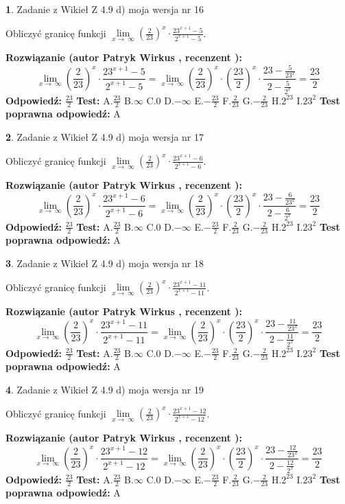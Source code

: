 \documentclass[12pt, a4paper]{article}
\theoremstyle{definition} %
\newtheorem{zad}{}
\newcommand{\zadStart}[1]{\begin{zad}#1\newline}
\newcommand{\zadStop}{\end{zad}}
\newcommand{\rozwStart}[2]{\noindent \textbf{Rozwiązanie (autor #1 , recenzent #2): }\newline}
\newcommand{\rozwStop}{\newline}
\newcommand{\odpStart}{\noindent \textbf{Odpowiedź:}\newline}
\newcommand{\odpStop}{\newline}
\newcommand{\testStart}{\noindent \textbf{Test:}\newline}
\newcommand{\testStop}{\newline}
\newcommand{\kluczStart}{\noindent \textbf{Test poprawna odpowiedź:}\newline}
\newcommand{\kluczStop}{\newline}
\begin{document}
\zadStart{Zadanie z Wikieł Z 4.9 d) moja wersja nr 16}


Obliczyć granicę funkcji  $\lim\limits_{x\to\ \infty}(\frac{2}{23})^{x}\cdot\frac{23^{x+1}-5}{2^{x+1}-5}$.
\zadStop
\rozwStart{Patryk Wirkus}{}
$$\lim\limits_{x\to\ \infty}(\frac{2}{23})^{x}\cdot\frac{23^{x+1}-5}{2^{x+1}-5}=\lim\limits_{x\to\ \infty}(\frac{2}{23})^{x}\cdot(\frac{23}{2})^{x} \cdot \frac{23-\frac{5}{23^{x}}}{2-\frac{5}{2^{x}}} = \frac{23}{2}$$
\rozwStop
\odpStart
$\frac{23}{2}$
\odpStop
\testStart
A.$\frac{23}{2}$ B.$\infty$ C.$0$ D.$-\infty$ E.$-\frac{23}{2}$
F.$\frac{2}{23}$ G.$-\frac{2}{23}$
H.$2^{23}$
I.$23^{2}$
\testStop
\kluczStart
A
\kluczStop



\zadStart{Zadanie z Wikieł Z 4.9 d) moja wersja nr 17}


Obliczyć granicę funkcji  $\lim\limits_{x\to\ \infty}(\frac{2}{23})^{x}\cdot\frac{23^{x+1}-6}{2^{x+1}-6}$.
\zadStop
\rozwStart{Patryk Wirkus}{}
$$\lim\limits_{x\to\ \infty}(\frac{2}{23})^{x}\cdot\frac{23^{x+1}-6}{2^{x+1}-6}=\lim\limits_{x\to\ \infty}(\frac{2}{23})^{x}\cdot(\frac{23}{2})^{x} \cdot \frac{23-\frac{6}{23^{x}}}{2-\frac{6}{2^{x}}} = \frac{23}{2}$$
\rozwStop
\odpStart
$\frac{23}{2}$
\odpStop
\testStart
A.$\frac{23}{2}$ B.$\infty$ C.$0$ D.$-\infty$ E.$-\frac{23}{2}$
F.$\frac{2}{23}$ G.$-\frac{2}{23}$
H.$2^{23}$
I.$23^{2}$
\testStop
\kluczStart
A
\kluczStop



\zadStart{Zadanie z Wikieł Z 4.9 d) moja wersja nr 18}


Obliczyć granicę funkcji  $\lim\limits_{x\to\ \infty}(\frac{2}{23})^{x}\cdot\frac{23^{x+1}-11}{2^{x+1}-11}$.
\zadStop
\rozwStart{Patryk Wirkus}{}
$$\lim\limits_{x\to\ \infty}(\frac{2}{23})^{x}\cdot\frac{23^{x+1}-11}{2^{x+1}-11}=\lim\limits_{x\to\ \infty}(\frac{2}{23})^{x}\cdot(\frac{23}{2})^{x} \cdot \frac{23-\frac{11}{23^{x}}}{2-\frac{11}{2^{x}}} = \frac{23}{2}$$
\rozwStop
\odpStart
$\frac{23}{2}$
\odpStop
\testStart
A.$\frac{23}{2}$ B.$\infty$ C.$0$ D.$-\infty$ E.$-\frac{23}{2}$
F.$\frac{2}{23}$ G.$-\frac{2}{23}$
H.$2^{23}$
I.$23^{2}$
\testStop
\kluczStart
A
\kluczStop



\zadStart{Zadanie z Wikieł Z 4.9 d) moja wersja nr 19}


Obliczyć granicę funkcji  $\lim\limits_{x\to\ \infty}(\frac{2}{23})^{x}\cdot\frac{23^{x+1}-12}{2^{x+1}-12}$.
\zadStop
\rozwStart{Patryk Wirkus}{}
$$\lim\limits_{x\to\ \infty}(\frac{2}{23})^{x}\cdot\frac{23^{x+1}-12}{2^{x+1}-12}=\lim\limits_{x\to\ \infty}(\frac{2}{23})^{x}\cdot(\frac{23}{2})^{x} \cdot \frac{23-\frac{12}{23^{x}}}{2-\frac{12}{2^{x}}} = \frac{23}{2}$$
\rozwStop
\odpStart
$\frac{23}{2}$
\odpStop
\testStart
A.$\frac{23}{2}$ B.$\infty$ C.$0$ D.$-\infty$ E.$-\frac{23}{2}$
F.$\frac{2}{23}$ G.$-\frac{2}{23}$
H.$2^{23}$
I.$23^{2}$
\testStop
\kluczStart
A
\kluczStop
\end{document}
